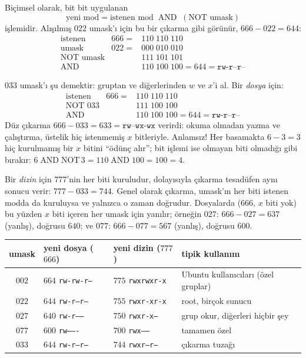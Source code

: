 \documentclass[11pt,a4paper]{article}
\begin{document}
Biçimsel olarak, bit bit uygulanan
\[
\text{yeni mod} = \text{istenen mod} \;\mathbin{\text{AND}}\; (\text{NOT umask})
\]
işlemidir. Alışılmış $022$ umask'ı için bu bir çıkarma gibi görünür, $666 - 022 = 644$:
\[
\begin{array}{lrl}
\text{istenen} & 666 = & 110\;110\;110 \\
\text{umask}     & 022 = & 000\;010\;010 \\
\text{NOT umask} &       & 111\;101\;101 \\ \hline
\text{AND}       &       & 110\;100\;100 = 644 = \texttt{rw-r--r--}
\end{array}
\]

\begin{example}
$033$ umask'ı şu demektir: gruptan ve diğerlerinden $w$ ve $x$'i al. Bir \emph{dosya} için:
\[
\begin{array}{lrl}
\text{istenen} & 666 = & 110\;110\;110 \\
\text{NOT } 033  &       & 111\;100\;100 \\ \hline
\text{AND}       &       & 110\;100\;100 = 644 = \texttt{rw-r--r--}
\end{array}
\]
Düz çıkarma $666 - 033 = 633 = \texttt{rw--wx-wx}$ verirdi: okuma olmadan yazma ve çalıştırma, üstelik hiç istenmemiş $x$ bitleriyle. Anlamsız! Her basamakta $6 - 3 = 3$ hiç kurulmamış bir $x$ bitini ``ödünç alır''; bit işlemi ise olmayan biti olmadığı gibi bırakır: $6 \mathbin{\text{AND}} \text{NOT}\,3 = 110 \mathbin{\text{AND}} 100 = 100 = 4$.

Bir \emph{dizin} için $777$'nin her biti kuruludur, dolayısıyla çıkarma tesadüfen aynı sonucu verir: $777 - 033 = 744$. Genel olarak çıkarma, umask'ın her biti istenen modda da kuruluysa ve yalnızca o zaman doğrudur. Dosyalarda ($666$, $x$ biti yok) bu yüzden $x$ biti içeren her umask için yanılır; örneğin $027$: $666 - 027 = 637$ (yanlış), doğrusu $640$; ve $077$: $666 - 077 = 567$ (yanlış), doğrusu $600$.
\end{example}

\begin{center}
\small
\begin{tabular}{@{}c l l l@{}}
\toprule
\textbf{umask} & \textbf{yeni dosya} ($666$) & \textbf{yeni dizin} ($777$) & \textbf{tipik kullanım} \\
\midrule
$002$ & $664$ \texttt{rw-rw-r--} & $775$ \texttt{rwxrwxr-x} & Ubuntu kullanıcıları (özel gruplar) \\
$022$ & $644$ \texttt{rw-r--r--} & $755$ \texttt{rwxr-xr-x} & root, birçok sunucu \\
$027$ & $640$ \texttt{rw-r-----} & $750$ \texttt{rwxr-x---} & grup okur, diğerleri hiçbir şey \\
$077$ & $600$ \texttt{rw-------} & $700$ \texttt{rwx------} & tamamen özel \\
$033$ & $644$ \texttt{rw-r--r--} & $744$ \texttt{rwxr--r--} & çıkarma tuzağı \\
\bottomrule
\end{tabular}
\end{center}
\end{document}
